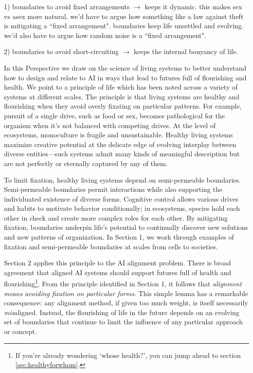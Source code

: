 \documentclass[11pt]{article}
\begin{document}
1) boundaries to avoid fixed arrangements $\rightarrow$ keeps it dynamic. this makes sex vs asex more natural. we'd have to argue how something like a law against theft is mitigating a ``fixed arrangement". boundaries keep life unsettled and evolving. we'd also have to argue how random noise is a ``fixed arrangement".

2) boundaries to avoid short-circuiting $\rightarrow$ keeps the internal bouyancy of life. 

In this Perspective we draw on the science of living systems to better understand how to design and relate to AI in ways that lead to futures full of flourishing and health. We point to a principle of life which has been noted across a variety of systems at different scales. The principle is that living systems are healthy and flourishing when they avoid overly fixating on particular patterns. For example, pursuit of a single drive, such as food or sex, becomes pathological for the organism when it's not balanced with competing drives. At the level of ecosystems, monoculture is fragile and unsustainable. Healthy living systems maximize creative potential at the delicate edge of evolving interplay between diverse entities---such systems admit many kinds of meaningful description but are not perfectly or eternally captured by any of them. 

To limit fixation, healthy living systems depend on semi-permeable boundaries. Semi-permeable boundaries permit interactions while also supporting the individuated existence of diverse forms. Cognitive control allows various drives and habits to motivate behavior conditionally; in ecosystems, species hold each other in check and create more complex roles for each other. By mitigating fixation, boundaries underpin life's potential to continually discover new solutions and new patterns of organization. In Section 1, we work through examples of fixation and semi-permeable boundaries at scales from cells to societies.

Section 2 applies this principle to the AI alignment problem. There is broad agreement that aligned AI systems should support futures full of health and flourishing\footnote{If you're already wondering `whose health?', you can jump ahead to section \ref{sec:healthyforwhom}.}. From the principle identified in Section 1, it follows that \textit{alignment means avoiding fixation on particular forms}. This simple lemma has a remarkable consequence: any alignment method, if given too much weight, is itself necessarily \textit{mis}aligned. Instead, the flourishing of life in the future depends on an evolving set of boundaries that continue to limit the influence of any particular approach or concept.
\end{document}
